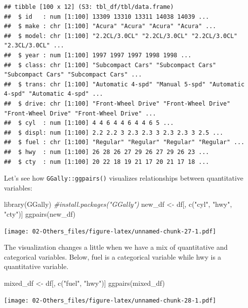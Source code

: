 \documentclass[
]{book}
\newenvironment{Shaded}{\begin{snugshade}}{\end{snugshade}}
\newcommand{\CommentTok}[1]{\textcolor[rgb]{0.56,0.35,0.01}{\textit{#1}}}
\newcommand{\FunctionTok}[1]{\textcolor[rgb]{0.00,0.00,0.00}{#1}}
\newcommand{\NormalTok}[1]{#1}
\newcommand{\OtherTok}[1]{\textcolor[rgb]{0.56,0.35,0.01}{#1}}
\newcommand{\StringTok}[1]{\textcolor[rgb]{0.31,0.60,0.02}{#1}}
\theoremstyle{definition}
\theoremstyle{definition}
\theoremstyle{definition}
\theoremstyle{definition}
\theoremstyle{remark}
\begin{document}
\begin{verbatim}
## tibble [100 x 12] (S3: tbl_df/tbl/data.frame)
##  $ id   : num [1:100] 13309 13310 13311 14038 14039 ...
##  $ make : chr [1:100] "Acura" "Acura" "Acura" "Acura" ...
##  $ model: chr [1:100] "2.2CL/3.0CL" "2.2CL/3.0CL" "2.2CL/3.0CL" "2.3CL/3.0CL" ...
##  $ year : num [1:100] 1997 1997 1997 1998 1998 ...
##  $ class: chr [1:100] "Subcompact Cars" "Subcompact Cars" "Subcompact Cars" "Subcompact Cars" ...
##  $ trans: chr [1:100] "Automatic 4-spd" "Manual 5-spd" "Automatic 4-spd" "Automatic 4-spd" ...
##  $ drive: chr [1:100] "Front-Wheel Drive" "Front-Wheel Drive" "Front-Wheel Drive" "Front-Wheel Drive" ...
##  $ cyl  : num [1:100] 4 4 6 4 4 6 4 4 6 5 ...
##  $ displ: num [1:100] 2.2 2.2 3 2.3 2.3 3 2.3 2.3 3 2.5 ...
##  $ fuel : chr [1:100] "Regular" "Regular" "Regular" "Regular" ...
##  $ hwy  : num [1:100] 26 28 26 27 29 26 27 29 26 23 ...
##  $ cty  : num [1:100] 20 22 18 19 21 17 20 21 17 18 ...
\end{verbatim}

Let's see how \texttt{GGally::ggpairs()} visualizes relationships between quantitative variables:

\begin{Shaded}
\begin{Highlighting}[]
\FunctionTok{library}\NormalTok{(GGally) }\CommentTok{\#install.packages("GGally")}
\NormalTok{new\_df }\OtherTok{\textless{}{-}}\NormalTok{ df[, }\FunctionTok{c}\NormalTok{(}\StringTok{"cyl"}\NormalTok{, }\StringTok{"hwy"}\NormalTok{, }\StringTok{"cty"}\NormalTok{)]}
\FunctionTok{ggpairs}\NormalTok{(new\_df)}
\end{Highlighting}
\end{Shaded}

\texttt{[image: 02-Others\_files/figure-latex/unnamed-chunk-27-1.pdf]}

The visualization changes a little when we have a mix of quantitative and categorical variables. Below, fuel is a categorical variable while hwy is a quantitative variable.

\begin{Shaded}
\begin{Highlighting}[]
\NormalTok{mixed\_df }\OtherTok{\textless{}{-}}\NormalTok{ df[, }\FunctionTok{c}\NormalTok{(}\StringTok{"fuel"}\NormalTok{, }\StringTok{"hwy"}\NormalTok{)]}
\FunctionTok{ggpairs}\NormalTok{(mixed\_df)}
\end{Highlighting}
\end{Shaded}

\texttt{[image: 02-Others\_files/figure-latex/unnamed-chunk-28-1.pdf]}
\end{document}
